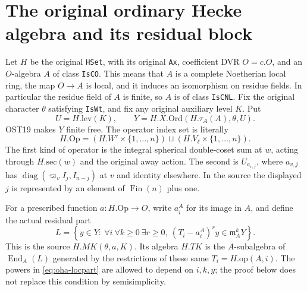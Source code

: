 \section{The original ordinary Hecke algebra and its residual block}
\label{sec:ordinary-hecke-algebra-v042}


Let \(H\) be the original \texttt{HSet}, with its original
\texttt{Ax}, coefficient DVR \(O=c.O\), and an \(O\)-algebra \(A\)
of class \texttt{IsCO}. This means that \(A\) is a complete
Noetherian local ring, the map \(O\to A\) is local, and it induces
an isomorphism on residue fields. In particular the residue field
of \(A\) is finite, so \(A\) is of class \texttt{IsCNL}.
Fix the original character \(\theta\) satisfying \texttt{IsWt},
and fix any original auxiliary level \(K\). Put
\[
 U=H.\mathrm{lev}(K),\qquad
 Y=H.X.\mathrm{Ord}(H.\tau_A(A),\theta,U).
\]
OST19 makes \(Y\) finite free. The operator index set is literally
\[
       H.\mathrm{Op}=(H.W'\times\{1,\ldots,n\})
                    \sqcup(H.V_\ell\times\{1,\ldots,n\}).
\]
The first kind of operator is the integral spherical double-coset
sum at \(w\), acting through \(H.\mathrm{sec}(w)\) and the original
away action. The second is \(U_{a_{v,j}}\), where \(a_{v,j}\) has
\(\operatorname{diag}(\varpi_v I_j,I_{n-j})\) at \(v\) and identity
elsewhere. In the source the displayed \(j\) is represented by
an element of \(\operatorname{Fin}(n)\) plus one.

For a prescribed function \(a:H.\mathrm{Op}\to O\), write
\(a_i^A\) for its image in \(A\), and define the actual residual
part
\begin{equation}\label{eq:oha-locpart}
 L=\left\{y\in Y:
   \ \forall i\ \forall k\ge0\ \exists r\ge0,\
               (T_i-a_i^A)^r y\in\mathfrak m_A^kY\right\}.
\end{equation}
This is the source \(H.MK(\theta,a,K)\). Its algebra \(H.TK\)
is the \(A\)-subalgebra of \(\operatorname{End}_A(L)\) generated
by the restrictions of these same \(T_i=H.\mathrm{op}(A,i)\).
The powers in \eqref{eq:oha-locpart} are allowed to depend on
\(i,k,y\); the proof below does not replace this condition by
semisimplicity.


